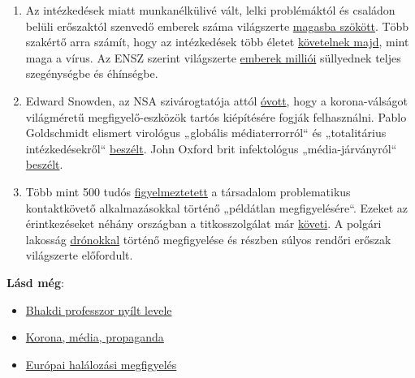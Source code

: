 \begin{enumerate}
{  sertésinfulenza} elleni oltóanyag részben súlyos
  \href{https://www.ibtimes.co.uk/brain-damaged-uk-victims-swine-flu-vaccine-get-60-million-compensation-1438572}{neurológiai
  károsodásokat} okozott és milliós összegű perekre vezetett.
\item
  Az intézkedések miatt munkanélkülivé vált, lelki problémáktól és
  családon belüli erőszaktól szenvedő emberek száma világszerte
  \href{https://www.reuters.com/article/us-health-coronavirus-usa-layoffs/us-weekly-jobless-claims-seen-at-record-high-again-idUSKBN21K0FX}{magasba
  szökött}. Több szakértő arra számít, hogy az intézkedések több életet
  \href{https://www.nytimes.com/2020/03/20/opinion/coronavirus-pandemic-social-distancing.html}{követelnek
  majd}, mint maga a vírus. Az ENSZ szerint világszerte
  \href{https://de.euronews.com/2020/04/22/un-warnen-welt-droht-wegen-corona-eine-hunger-pandemie-von-biblischen-ausma-en}{emberek
  milliói} süllyednek teljes szegénységbe és éhínségbe.
\item
  Edward Snowden, az NSA szivárogtatója attól
  \href{https://www.youtube.com/watch?v=-pcQFTzck_c}{óvott}, hogy a
  korona-válságot világméretű megfigyelő-eszközök tartós kiépítésére
  fogják felhasználni. Pablo Goldschmidt elismert virológus „globális
  médiaterrorról`` és „totalitárius intézkedésekről``
  \href{https://www.rubikon.news/artikel/der-corona-totalitarismus}{beszélt}.
  John Oxford brit infektológus „média-járványról``
  \href{https://novuscomms.com/2020/03/31/a-view-from-the-hvivo-open-orphan-orph-laboratory-professor-john-oxford/}{beszélt}.
\item
  Több mint 500 tudós
  \href{https://www.esat.kuleuven.be/cosic/sites/contact-tracing-joint-statement/}{figyelmeztetett}
  a társadalom problematikus kontaktkövető alkalmazásokkal történő
  „példátlan megfigyelésére``. Ezeket az érintkezéseket néhány országban
  a titkosszolgálat már
  \href{https://www.jewishpress.com/news/the-courts/state-to-high-court-even-more-shin-bet-involvement-in-fighting-the-coronavirus/2020/04/14/}{követi}.
  A polgári lakosság
  \href{https://off-guardian.org/2020/04/25/50-headlines-darker-more-of-the-new-normal/}{drónokkal}
  történő megfigyelése és részben súlyos rendőri erőszak világszerte
  előfordult.
\end{enumerate}

\textbf{Lásd még}:

\begin{itemize}
\tightlist
\item
  \href{https://swprs.org/open-letter-from-professor-sucharit-bhakdi-to-german-chancellor-dr-angela-merkel/}{Bhakdi
  professzor nyílt levele}\\
\item
  \href{https://swprs.org/korona-media-propaganda/}{Korona, média,
  propaganda}
\item
  \href{https://www.euromomo.eu/}{Európai halálozási megfigyelés}
\end{itemize}

